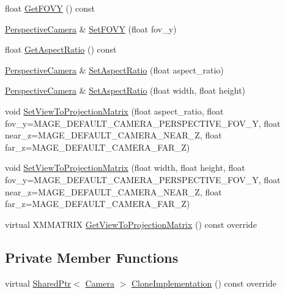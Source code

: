 \begin{DoxyCompactItemize}
\item 
float \hyperlink{classmage_1_1_perspective_camera_a15223034b30ca691c51de8850c033293}{Get\+F\+O\+VY} () const
\item 
\hyperlink{classmage_1_1_perspective_camera}{Perspective\+Camera} \& \hyperlink{classmage_1_1_perspective_camera_a2b6357e96bfbd5a322863cf6e72bb889}{Set\+F\+O\+VY} (float fov\+\_\+y)
\item 
float \hyperlink{classmage_1_1_perspective_camera_ab74cbd2777d5b430da5702a12b1b451e}{Get\+Aspect\+Ratio} () const
\item 
\hyperlink{classmage_1_1_perspective_camera}{Perspective\+Camera} \& \hyperlink{classmage_1_1_perspective_camera_afa5b9b8f6d1945fe63e9121359fb39bb}{Set\+Aspect\+Ratio} (float aspect\+\_\+ratio)
\item 
\hyperlink{classmage_1_1_perspective_camera}{Perspective\+Camera} \& \hyperlink{classmage_1_1_perspective_camera_a8fa66b4025306709cf825b267c866b29}{Set\+Aspect\+Ratio} (float width, float height)
\item 
void \hyperlink{classmage_1_1_perspective_camera_a7a7d25bbf0b5cf7952de9a3af280558b}{Set\+View\+To\+Projection\+Matrix} (float aspect\+\_\+ratio, float fov\+\_\+y=M\+A\+G\+E\+\_\+\+D\+E\+F\+A\+U\+L\+T\+\_\+\+C\+A\+M\+E\+R\+A\+\_\+\+P\+E\+R\+S\+P\+E\+C\+T\+I\+V\+E\+\_\+\+F\+O\+V\+\_\+Y, float near\+\_\+z=M\+A\+G\+E\+\_\+\+D\+E\+F\+A\+U\+L\+T\+\_\+\+C\+A\+M\+E\+R\+A\+\_\+\+N\+E\+A\+R\+\_\+Z, float far\+\_\+z=M\+A\+G\+E\+\_\+\+D\+E\+F\+A\+U\+L\+T\+\_\+\+C\+A\+M\+E\+R\+A\+\_\+\+F\+A\+R\+\_\+Z)
\item 
void \hyperlink{classmage_1_1_perspective_camera_a7e0688cce05ce5a0007fb000e8f1a43a}{Set\+View\+To\+Projection\+Matrix} (float width, float height, float fov\+\_\+y=M\+A\+G\+E\+\_\+\+D\+E\+F\+A\+U\+L\+T\+\_\+\+C\+A\+M\+E\+R\+A\+\_\+\+P\+E\+R\+S\+P\+E\+C\+T\+I\+V\+E\+\_\+\+F\+O\+V\+\_\+Y, float near\+\_\+z=M\+A\+G\+E\+\_\+\+D\+E\+F\+A\+U\+L\+T\+\_\+\+C\+A\+M\+E\+R\+A\+\_\+\+N\+E\+A\+R\+\_\+Z, float far\+\_\+z=M\+A\+G\+E\+\_\+\+D\+E\+F\+A\+U\+L\+T\+\_\+\+C\+A\+M\+E\+R\+A\+\_\+\+F\+A\+R\+\_\+Z)
\item 
virtual X\+M\+M\+A\+T\+R\+IX \hyperlink{classmage_1_1_perspective_camera_a83a38a4e8180707df2323130f9cee4a5}{Get\+View\+To\+Projection\+Matrix} () const override
\end{DoxyCompactItemize}
\subsection*{Private Member Functions}
\begin{DoxyCompactItemize}
\item 
virtual \hyperlink{namespacemage_a1e01ae66713838a7a67d30e44c67703e}{Shared\+Ptr}$<$ \hyperlink{classmage_1_1_camera}{Camera} $>$ \hyperlink{classmage_1_1_perspective_camera_a247e65aa0ad584f8a1faeacd7196785a}{Clone\+Implementation} () const override
\end{DoxyCompactItemize}
